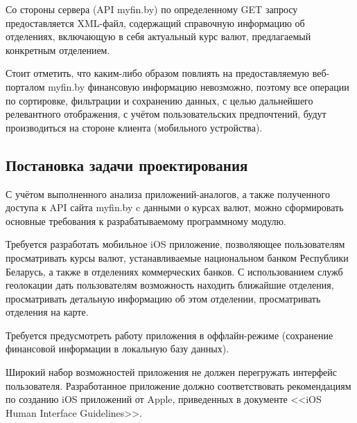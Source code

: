 Со стороны сервера (API myfin.by) по определенному GET запросу
предоставляется XML-файл, содержащий справочную информацию об отделениях,
включающую в себя актуальный курс валют, предлагаемый конкретным отделением.

Стоит отметить, что каким-либо образом повлиять на предоставляемую веб-порталом myfin.by
финансовую информацию невозможно, поэтому все операции по сортировке, фильтрации и
сохранению данных, с целью дальнейшего релевантного отображения, с учётом пользовательских
предпочтений, будут производиться на стороне клиента (мобильного устройства).



\subsection{Постановка задачи проектирования}

С учётом выполненного анализа приложений-аналогов, а также полученного доступа к
API сайта myfin.by c данными о курсах валют, можно сформировать основные
требования к разрабатываемому программному модулю.

Требуется разработать мобильное iOS приложение, позволяющее пользователям
просматривать курсы валют, устанавливаемые национальном банком Республики Беларусь,
а также в отделениях коммерческих банков. С использованием
служб геолокации дать пользователям возможность находить ближайшие отделения,
просматривать детальную информацию об этом отделении, просматривать отделения
на карте.

Требуется предусмотреть работу приложения в
оффлайн-режиме (сохранение финансовой информации в локальную базу данных).

Широкий набор возможностей приложения не должен перегружать
интерфейс пользователя.
Разработанное приложение должно соответствовать рекомендациям по созданию
iOS приложений от Apple, приведенных в документе <<iOS Human Interface Guidelines>>.
